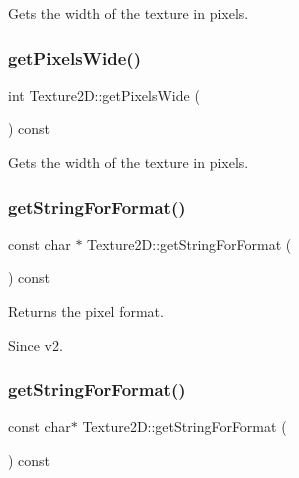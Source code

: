 Gets the width of the texture in pixels. \mbox{\label{classTexture2D_a87918e080c6edb84236e2438c055307b}} 
\subsubsection{\texorpdfstring{get\+Pixels\+Wide()}{getPixelsWide()}\hspace{0.1cm}{\footnotesize\ttfamily [2/2]}}
{\footnotesize\ttfamily int Texture2\+D\+::get\+Pixels\+Wide (\begin{DoxyParamCaption}{ }\end{DoxyParamCaption}) const}

Gets the width of the texture in pixels. \mbox{\label{classTexture2D_ac3c139b0e9dd7a2e02b8b8e8d413620b}} 
\subsubsection{\texorpdfstring{get\+String\+For\+Format()}{getStringForFormat()}\hspace{0.1cm}{\footnotesize\ttfamily [1/2]}}
{\footnotesize\ttfamily const char $\ast$ Texture2\+D\+::get\+String\+For\+Format (\begin{DoxyParamCaption}{ }\end{DoxyParamCaption}) const}

Returns the pixel format. \begin{DoxySince}{Since}
v2. 
\end{DoxySince}
\mbox{\label{classTexture2D_a8d12a9614b12a67a7956182004e92ca0}} 
\subsubsection{\texorpdfstring{get\+String\+For\+Format()}{getStringForFormat()}\hspace{0.1cm}{\footnotesize\ttfamily [2/2]}}
{\footnotesize\ttfamily const char$\ast$ Texture2\+D\+::get\+String\+For\+Format (\begin{DoxyParamCaption}{ }\end{DoxyParamCaption}) const}

